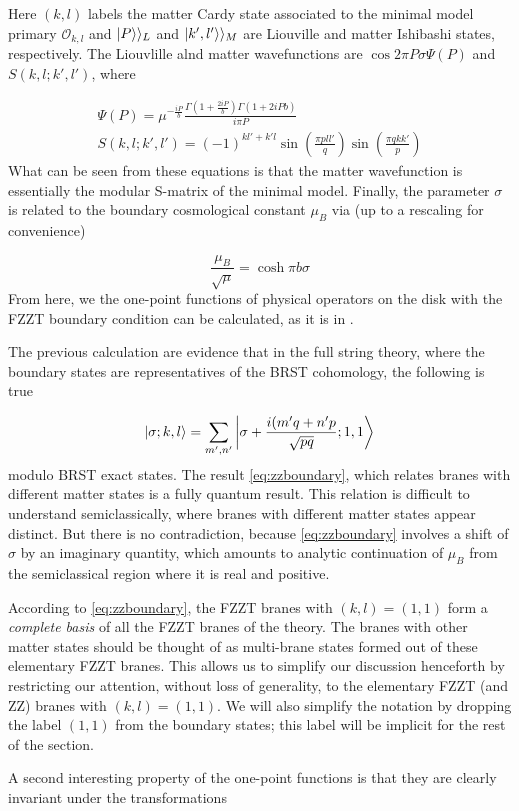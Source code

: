Here $(k,l)$ labels the matter Cardy state associated to the minimal model primary $\mathcal{O}_{k,l}$ and $\ket{P}\rangle_L$ and $\ket{k',l'}\rangle_M$ are Liouville and matter Ishibashi states, respectively. The Liouvlille alnd matter wavefunctions are $\cos{2\pi P\sigma}\Psi(P)$ and $S(k,l;k',l')$, where

\begin{gather}
\Psi(P) = \mu^{-\frac{iP}{b}}\frac{\Gamma(1+\frac{2iP}{b})\Gamma(1+2iPb)}{i\pi P}\\
S(k,l;k',l') = (-1)^{kl'+k'l}\sin(\frac{\pi p l l'}{q})\sin(\frac{\pi q k k'}{p})
\end{gather}
What can be seen from these equations is that the matter wavefunction is essentially the modular S-matrix of the minimal model. Finally, the parameter $\sigma$ is related to the boundary cosmological constant $\mu_B$ via (up to a rescaling for convenience)

\begin{equation}
\frac{\mu_B}{\sqrt{\mu}} = \cosh\pi b\sigma
\end{equation}
From here, we the one-point functions of physical operators on the disk with the FZZT boundary condition can be calculated, as it is in \cite{Shih04}.
\par
The previous calculation are evidence that in the full string theory, where the boundary states are representatives of the BRST cohomology, the following is true

\begin{equation}
\ket{\sigma;k,l} = \sum_{m',n'}{\ket{\sigma + \frac{i(m'q + n'p}{\sqrt{pq}};1,1}}
\label{eq:zzboundary}
\end{equation}
modulo BRST exact states. The result \eqref{eq:zzboundary}, which relates branes with different matter states is a fully quantum result. This relation is difficult to understand semiclassically, where branes with different matter states appear distinct. But there is no contradiction, because \eqref{eq:zzboundary} involves a shift of $\sigma$ by an imaginary quantity, which amounts to analytic continuation of $\mu_B$ from the semiclassical region where it is real and positive.
\par
According to \eqref{eq:zzboundary}, the FZZT branes with $(k,l) = (1,1)$ form a \textit{complete basis} of all the FZZT branes of the theory. The branes with other matter states should be thought of as multi-brane states formed out of these elementary FZZT branes. This allows us to simplify our discussion henceforth by restricting our attention, without loss of generality, to the elementary FZZT (and ZZ) branes with $(k,l) = (1,1)$. We will also simplify the notation by dropping the label $(1,1)$ from the boundary states; this label will be implicit for the rest of the section.
\par
A second interesting property of the one-point functions is that they are clearly invariant under the transformations

